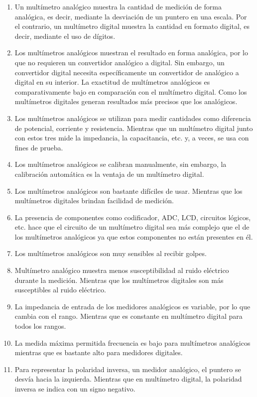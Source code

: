 \documentclass[10pt]{article}
\begin{document}
\begin{multicols}{2}
\begin{center}
\end{center}
\begin{enumerate}
\item Un multímetro analógico muestra la cantidad de medición de forma analógica, es decir, mediante la desviación de un puntero en una escala. Por el contrario, un multímetro digital muestra la cantidad en formato digital, es decir, mediante el uso de dígitos.
\item Los multímetros analógicos muestran el resultado en forma analógica, por lo que no requieren un convertidor analógico a digital. Sin embargo, un convertidor digital necesita específicamente un convertidor de analógico a digital en su interior. La exactitud de multímetros analógicos es comparativamente bajo en comparación con el multímetro digital. Como los multímetros digitales generan resultados más precisos que los analógicos.
\item Los multímetros analógicos se utilizan para medir cantidades como diferencia de potencial, corriente y resistencia. Mientras que un multímetro digital junto con estos tres mide la impedancia, la capacitancia, etc. y, a veces, se usa con fines de prueba.
\item Los multímetros analógicos se calibran manualmente, sin embargo, la calibración automática es la ventaja de un multímetro digital.
\item Los multímetros analógicos son bastante difíciles de usar. Mientras que los multímetros digitales brindan facilidad de medición.
\item La presencia de componentes como codificador, ADC, LCD, circuitos lógicos, etc. hace que el circuito de un multímetro digital sea más complejo que el de los multímetros analógicos ya que estos componentes no están presentes en él.
\item Los multímetros analógicos son muy sensibles al recibir golpes.
\item Multímetro analógico muestra menos susceptibilidad al ruido eléctrico durante la medición. Mientras que los multímetros digitales son más susceptibles al ruido eléctrico.
\item La impedancia de entrada de los medidores analógicos es variable, por lo que cambia con el rango. Mientras que es constante en multímetro digital para todos los rangos.
\item La medida máxima permitida frecuencia es bajo para multímetros analógicos mientras que es bastante alto para medidores digitales.
\item Para representar la polaridad inversa, un medidor analógico, el puntero se desvía hacia la izquierda. Mientras que en multímetro digital, la polaridad inversa se indica con un signo negativo.
\end{enumerate}


\end{multicols}
\end{document}
